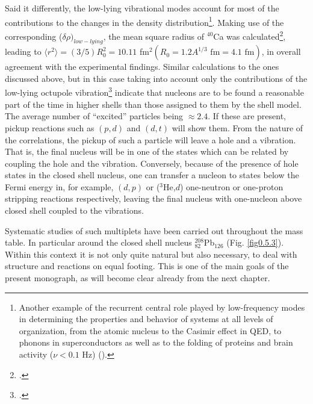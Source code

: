 \documentclass[a4paper,11pt]{book}
\numberwithin{equation}{section}
\numberwithin{figure}{section}
\numberwithin{table}{section}
\newcommand{\braket}[1]{\langle {#1} \rangle }
\begin{document}
Said it differently,  the low-lying vibrational modes  account for most of the contributions to the changes in the density distribution\footnote{Another example of the  recurrent central role played by low-frequency modes in determining the properties and behavior of systems at all levels of organization, from the atomic nucleus to the Casimir effect in QED, to phonons in superconductors as well as  to the folding of proteins and brain  activity ($\nu<0.1$ Hz) (\cite{Mitra:18}).}. Making use of the corresponding ($\delta\rho)_{low-lying}$, the mean square radius of $^{40}$Ca was calculated\footnote{\cite{Barranco:87a}.}, leading to $\braket{r^2}=(3/5)R_0^2=10.11$ fm$^2 (R_0=1.2A^{1/3}\text{ fm}=4.1\text{ fm})$, in overall agreement with the experimental findings. Similar calculations to the ones discussed above, but in this case taking into account only the contributions of the low-lying octupole vibration\footnote{\cite{Brown:63}.} indicate that nucleons are to be found a reasonable part of the time in higher shells than those assigned to them by the shell model. The average number of ``excited'' particles being $\approx2.4$. If these are present, pickup reactions such as $(p,d)$ and $(d,t)$ will show them. From the nature of the correlations, the pickup of such a particle will leave a hole and a vibration. That is, the final nucleus will be in one of the states which can be related by coupling the hole and the vibration. Conversely, because of the presence of hole states in the closed shell nucleus, one can transfer a nucleon to states below the Fermi energy in, for example, $(d,p)$ or ($^3$He,$d$) one-neutron or one-proton stripping reactions respectively, leaving the final nucleus with one-nucleon above closed shell coupled to the vibrations.


Systematic studies of such multiplets have been carried out throughout the mass table. In particular around the closed shell nucleus $^{208}_{82}$Pb$_{126}$ (Fig. \ref{fig0.5.3}). Within this context it is not only  quite natural but also necessary, to deal with structure and reactions on equal footing.  This is one of the main goals of the present monograph, as will become clear already from the next chapter. 
















\end{document}
